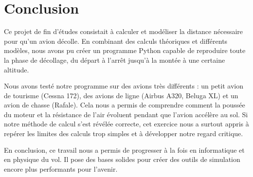 	 

	\vspace*{4cm}
	
	\section{Conclusion}
	
		Ce projet de fin d'études consistait à calculer et modéliser la distance nécessaire pour qu’un avion décolle. En combinant des calculs théoriques et différents modèles, nous avons pu créer un programme Python capable de reproduire toute la phase de décollage, du départ à l'arrêt jusqu'à la montée à une certaine altitude.
		
		Nous avons testé notre programme sur des avions très différents : un petit avion de tourisme (Cessna 172), des avions de ligne (Airbus A320, Beluga XL) et un avion de chasse (Rafale). Cela nous a permis de comprendre comment la poussée du moteur et la résistance de l'air évoluent pendant que l'avion accélère au sol. Si notre méthode de calcul s'est révélée correcte, cet exercice nous a surtout appris à repérer les limites des calculs trop simples et à développer notre regard critique.
		
		En conclusion, ce travail nous a permis de progresser à la fois en informatique et en physique du vol. Il pose des bases solides pour créer des outils de simulation encore plus performants pour l'avenir.